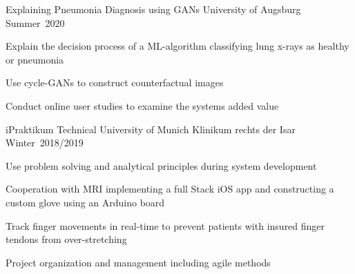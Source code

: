 \begin{cventries}
	 \cventry
	{Explaining Pneumonia Diagnosis using GANs} %
	{University of Augsburg} %
	{}
	{Summer~2020}
	{
		\begin{cvitems} %
			\item {Explain the decision process of a ML-algorithm classifying lung x-rays as healthy or pneumonia}
			\item {Use cycle-GANs to construct counterfactual images }
			\item {Conduct online user studies to examine the systems added value}
		\end{cvitems}
	}%

  \cventry
  {iPraktikum} %
  {Technical University of Munich} %
  {Klinikum rechts der Isar}
  {Winter~2018/2019}
  {
    \begin{cvitems} %
    \item {Use problem solving and analytical principles during system development}
      \item {Cooperation with MRI implementing a full Stack iOS app and constructing a custom glove using an Arduino board}
      \item {Track finger movements in real-time to prevent patients with insured finger tendons from over-stretching }
      \item {Project organization and management including agile methods}
    \end{cvitems}
  }%
  
\end{cventries}

